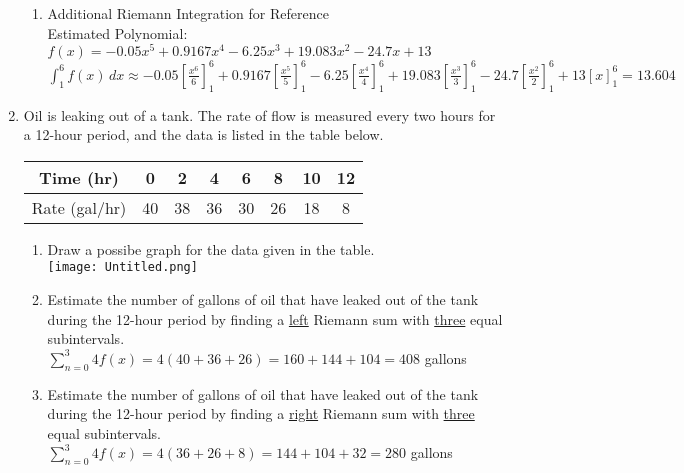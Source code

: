 \documentclass[10pt, letterpaper]{report}
\begin{document}
\begin{enumerate}
\begin{enumerate}
      \item{Additional Riemann Integration for Reference} \\

        Estimated Polynomial: $f(x)=-0.05x^{5}+0.9167x^{4}-6.25x^{3}+19.083x^{2}-24.7x+13$ \\

        $\int_{1}^{6} f(x)\,dx\approx-0.05[\frac{x^{6}}{6}]_{1}^{6}+0.9167[\frac{x^5}{5}]_{1}^{6}-6.25[\frac{x^{4}}{4}]_{1}^{6}+19.083[\frac{x^{3}}{3}]_{1}^{6}-24.7[\frac{x^2}{2}]_{1}^{6}+13[x]_{1}^{6}=13.604$ \\

    \end{enumerate}
\pagebreak
  \item{Oil is leaking out of a tank. The rate of flow is measured every two hours for a 12-hour period, and the data is listed in the table below.
    \begin{center}
      \begin{tabular}{| c | c | c | c | c | c | c | c |}
        \hline
        Time (hr) & 0 & 2 & 4 & 6 & 8 & 10 & 12 \\
        \hline
        Rate (gal/hr) & 40 & 38 & 36 & 30 & 26 & 18 & 8 \\
        \hline
      \end{tabular}
    \end{center}}
    \begin{enumerate}
      \item{Draw a possibe graph for the data given in the table.} \\
        \texttt{[image: Untitled.png]}
      \item{Estimate the number of gallons of oil that have leaked out of the tank during the 12-hour period by finding a \underline{left} Riemann sum with \underline{three} equal subintervals.} \\

        $\sum_{n=0}^{3}4f(x)=
        4(40+36+26)=
        160+144+104=408$ gallons \\

      \item{Estimate the number of gallons of oil that have leaked out of the tank during the 12-hour period by finding a \underline{right} Riemann sum with \underline{three} equal subintervals.} \\

        $\sum_{n=0}^{3}4f(x)=
        4(36+26+8)=
        144+104+32=280$ gallons \\


\end{enumerate}
\end{enumerate}
\end{document}
